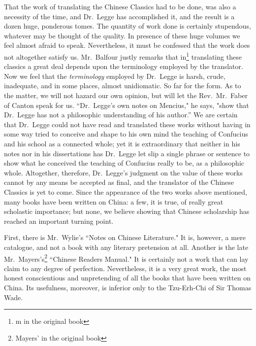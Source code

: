 That the work of translating the Chinese Classics had to be done, was also a necessity of the time, and Dr.~Legge has accomplished it, and the result is a dozen huge, ponderous tomes.
The quantity of work done is certainly stupendous, whatever may be thought of the quality.
In presence of these huge volumes we feel almost afraid to speak.
Nevertheless, it must be confessed that the work does not altogether satisfy us.
Mr.~Balfour  justly remarks that in\footnote{m in the original book} translating these classics a great deal depends upon the terminology employed by the translator.
Now we feel that the \emph{terminology} employed by Dr.~Legge is harsh, crude, inadequate, and in some places, almost unidiomatic.
So far for the form.
As to the matter, we will not hazard our own opinion, but will let the Rev.~Mr.~Faber  of Canton speak for us.
``Dr.~Legge's own notes on Mencius," he says, "show that Dr.~Legge has not a philosophic understanding of his author.''
We are certain that Dr.~Legge could not have read and translated these works without having in some way tried to conceive and shape to his own mind the teaching of Confucius and his school as a connected whole; yet it is extraordinary that neither in his notes nor in his dissertations has Dr.~Legge let slip a single phrase or sentence to show what he conceived the teaching of Confucius really to be, as a philosophic whole.
Altogether, therefore, Dr.~Legge's judgment on the value of these works cannot by any means  be accepted as final, and the translator of the Chinese Classics is yet to come.
Since the appearance of the two works above mentioned, many books have been written on China: a few, it is true, of really great scholastic importance; but none, we believe showing that Chinese scholarship has reached an important turning point.

First, there is Mr.~Wylie's   ``Notes on Chinese Literature."
It is, however, a mere catalogue, and not a book with any literary pretension at all.
Another is the late Mr.~Mayers's\footnote{Mayers' in the original book}  ``Chinese Readers Manual."
It is certainly not a work that can lay claim to any degree of perfection.
Nevertheless, it is a very great work, the most honest conscientious and unpretending of all the books that have been written on China.
Its usefulness, moreover, is inferior only to the Tzu-Erh-Chi of Sir Thomas Wade.

